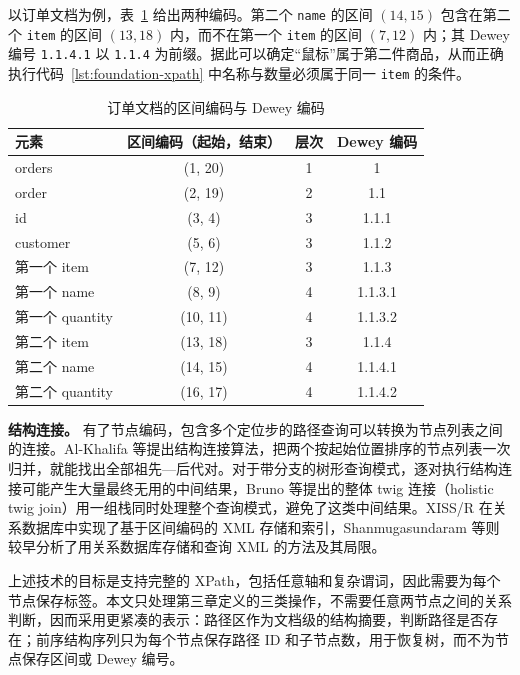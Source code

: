 以订单文档为例，表~\ref{tab:foundation-region} 给出两种编码。第二个 \texttt{name} 的区间 $(14,15)$ 包含在第二个 \texttt{item} 的区间 $(13,18)$ 内，而不在第一个 \texttt{item} 的区间 $(7,12)$ 内；其 Dewey 编号 \texttt{1.1.4.1} 以 \texttt{1.1.4} 为前缀。据此可以确定“鼠标”属于第二件商品，从而正确执行代码~\ref{lst:foundation-xpath} 中名称与数量必须属于同一 \texttt{item} 的条件。

\begin{table}[htbp]
\centering
\caption{订单文档的区间编码与 Dewey 编码}
\label{tab:foundation-region}
\begin{tabular}{lccc}
\toprule
元素 & 区间编码（起始，结束） & 层次 & Dewey 编码 \\
\midrule
orders & (1, 20) & 1 & 1 \\
order & (2, 19) & 2 & 1.1 \\
id & (3, 4) & 3 & 1.1.1 \\
customer & (5, 6) & 3 & 1.1.2 \\
第一个 item & (7, 12) & 3 & 1.1.3 \\
第一个 name & (8, 9) & 4 & 1.1.3.1 \\
第一个 quantity & (10, 11) & 4 & 1.1.3.2 \\
第二个 item & (13, 18) & 3 & 1.1.4 \\
第二个 name & (14, 15) & 4 & 1.1.4.1 \\
第二个 quantity & (16, 17) & 4 & 1.1.4.2 \\
\bottomrule
\end{tabular}
\end{table}

\textbf{结构连接。} 有了节点编码，包含多个定位步的路径查询可以转换为节点列表之间的连接。Al-Khalifa 等提出结构连接算法，把两个按起始位置排序的节点列表一次归并，就能找出全部祖先—后代对\cite{alkhalifa2002structural}。对于带分支的树形查询模式，逐对执行结构连接可能产生大量最终无用的中间结果，Bruno 等提出的整体 twig 连接（holistic twig join）用一组栈同时处理整个查询模式，避免了这类中间结果\cite{bruno2002holistic}。XISS/R 在关系数据库中实现了基于区间编码的 XML 存储和索引\cite{harding2003xissr}，Shanmugasundaram 等则较早分析了用关系数据库存储和查询 XML 的方法及其局限\cite{shanmugasundaram1999relational}。

上述技术的目标是支持完整的 XPath，包括任意轴和复杂谓词，因此需要为每个节点保存标签。本文只处理第三章定义的三类操作，不需要任意两节点之间的关系判断，因而采用更紧凑的表示：路径区作为文档级的结构摘要，判断路径是否存在；前序结构序列只为每个节点保存路径 ID 和子节点数，用于恢复树，而不为节点保存区间或 Dewey 编号。

